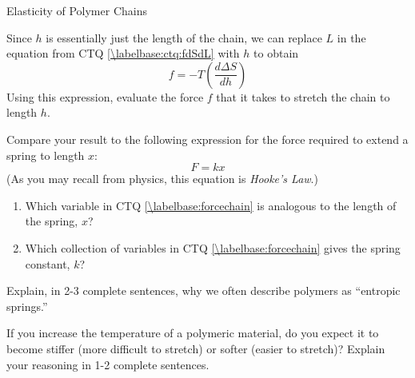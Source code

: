 \begin{activity}{Elasticity of Polymer Chains}
\begin{ctqs}
	\question Since $h$ is essentially just the length of the chain, we can replace $L$ in the equation from CTQ \ref{\labelbase:ctq:fdSdL} with $h$ to obtain
		\begin{equation*}
			f = -T\left(\frac{d\Delta S}{dh}\right)
		\end{equation*}
		Using this expression, evaluate the force $f$ that it takes to stretch the chain to length $h$.
		
		\begin{solution}[2in]
		\end{solution}
		
	\question Compare your result to the following expression for the force required to extend a spring to length $x$:
		\begin{equation*}
			F = kx
		\end{equation*}
		(As you may recall from physics, this equation is \emph{Hooke's Law}.)
		
		\begin{enumerate}
			\item Which variable in CTQ \ref{\labelbase:forcechain} is analogous to the length of the spring, $x$?
		
				\begin{solution}[1in]
				\end{solution}
			
			\item Which collection of variables in CTQ \ref{\labelbase:forcechain} gives the spring constant, $k$?
		
				\begin{solution}[1in]
				\end{solution}
			
		\end{enumerate}
		
	\question Explain, in 2-3 complete sentences, why we often describe polymers as ``entropic springs.''
	
		\begin{solution}[2in]
		\end{solution}
	
\end{ctqs}
	
	
\begin{exercises}
	\exercise If you increase the temperature of a polymeric material, do you expect it to become stiffer (more difficult to stretch) or softer (easier to stretch)?  Explain your reasoning in 1-2 complete sentences.
\end{exercises}
	
\end{activity}